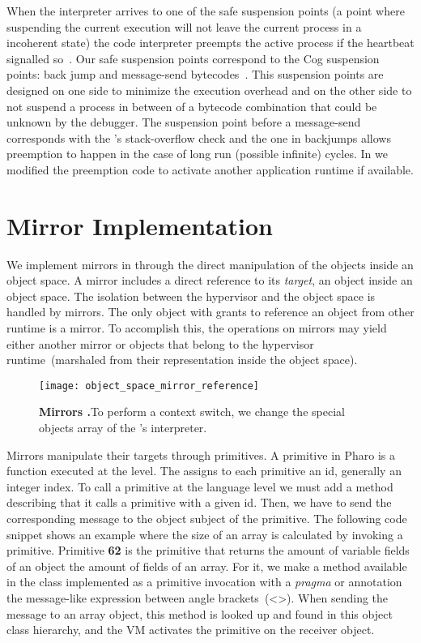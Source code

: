 When the \VM interpreter arrives to one of the safe suspension points (\ie a point where suspending the current execution will not leave the current process in a incoherent state) the code interpreter preempts the active process if the heartbeat signalled so~\cite{Deut84a}. Our safe suspension points correspond to the Cog \VM suspension points: back jump and message-send bytecodes~\cite{Mira11a}. This suspension points are designed on one side to minimize the execution overhead and on the other side to not suspend a process in between of a bytecode combination that could be unknown by the debugger. The suspension point before a message-send corresponds with the \VM's stack-overflow check and the one in backjumps allows preemption to happen in the case of long run (possible infinite) cycles. In \Vtt we modified the preemption code to activate another application runtime if available.

\section{\Vtt Mirror Implementation}\label{sec:implementation_mirrors}

We implement mirrors in \Vtt through the direct manipulation of the objects inside an object space. A \Vtt mirror includes a direct reference to its \emph{target}, an object inside an object space. The isolation between the hypervisor and the object space is handled by mirrors. The only object with grants to reference an object from other runtime is a mirror. To accomplish this, the operations on mirrors may yield either another mirror or objects that belong to the hypervisor runtime~(marshaled from their representation inside the object space).

\begin{figure}[htb]
\begin{center}
\texttt{[image: object\_space\_mirror\_reference]}
\caption{\textbf{Mirrors .}To perform a context switch, we change the special objects array of the \VM's interpreter.\label{fig:mirror_reference}}
\end{center}
\end{figure}

Mirrors manipulate their targets through \VM primitives. A primitive in Pharo is a function executed at the \VM level. The \VM assigns to each primitive an id, generally an integer index. To call a primitive at the language level we must add a method describing that it calls a primitive with a given id. Then, we have to send the corresponding message to the object subject of the primitive. The following code snippet shows an example where the size of an array is calculated by invoking a primitive. Primitive \textbf{62} is the primitive that returns the amount of variable fields of an object \eg the amount of fields of an array. For it, we make a method  available in the  class implemented as a primitive invocation with a \emph{pragma} or annotation \ie the message-like expression between angle brackets~(<>). When sending the message  to an array object, this method is looked up and found in this object class hierarchy, and the VM activates the primitive on the receiver object.

